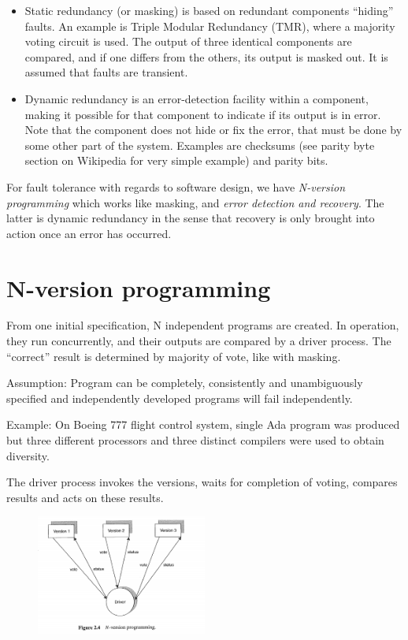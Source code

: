 \begin{itemize}
\item Static redundancy (or masking) is based on redundant components
“hiding” faults. An example is Triple Modular Redundancy (TMR),
where a majority voting circuit is used. The output of three identical
components are compared, and if one differs from the others, its output
is masked out. It is assumed that faults are transient.
\item Dynamic redundancy is an error-detection facility within a component, making it possible for that component to indicate if its output is
in error. Note that the component does not hide or fix the error, that
must be done by some other part of the system. Examples are checksums (see parity byte section on Wikipedia for very simple example) and parity bits. 
\end{itemize}

For fault tolerance with regards to software design, we have \textit{N-version programming} which works like masking, and \textit{error detection and recovery}.
The latter is dynamic redundancy in the sense that recovery is only brought
into action once an error has occurred.

\section{N-version programming}
From one initial specification, N independent programs are created. In operation, they run concurrently, and their outputs are compared by a driver process. The “correct” result is determined by majority of vote, like with masking. 

Assumption: Program can be completely, consistently and unambiguously specified and independently developed programs will fail independently.

Example: On Boeing 777 flight control system, single Ada program was produced  but three different processors and three distinct compilers were used to obtain diversity.

The driver process invokes the versions, waits for completion of voting, compares results and acts on these results.

\begin{figure}[H]
\centering
\includegraphics[width=0.5\textwidth]{figures/Fault_Tolerance/N_version_programming.PNG}
\end{figure}

